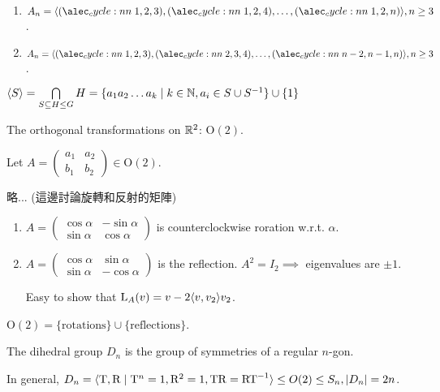 \begin{exercise} \mbox{}
  \begin{enumerate}
    \item $A_n = \langle\cycle{1,2,3},\cycle{1,2,4},\dots,\cycle{1,2,n}\rangle, n \ge 3$.
    \item $A_n = \langle\cycle{1,2,3},\cycle{2,3,4},\dots,\cycle{n-2,n-1,n}\rangle, n \ge 3$.
  \end{enumerate}
\end{exercise}

\begin{remark}
  $\langle S \rangle = \bigcap\limits_{S \subseteq H \le G} H =
  \{ a_1a_2\dots a_k \mid k \in \mathbb{N}, a_i \in S \cup S^{-1}\} \cup \{1\}$
\end{remark}

The orthogonal transformations on $\mathbb{R}^2$: $\text{O}(2)$.

Let $A = \begin{pmatrix}a_1 & a_2 \\ b_1 & b_2\end{pmatrix} \in \text{O}(2)$.

略... (這邊討論旋轉和反射的矩陣)

\begin{enumerate}
  \item $A = \begin{pmatrix}
      \cos\alpha & -\sin\alpha \\
      \sin\alpha & \cos\alpha
    \end{pmatrix}$ is counterclockwise roration w.r.t. $\alpha$.
  \item $A = \begin{pmatrix}
      \cos\alpha & \sin\alpha \\
      \sin\alpha & -\cos\alpha
    \end{pmatrix}$ is the reflection.
    $A^2 = I_2 \implies$ eigenvalues are $\pm 1$.

    Easy to show that $\text{L}_A(v) = v - 2 \langle v, v_2\rangle v_2$.
\end{enumerate}

$\text{O}(2) = \{\text{rotations}\} \cup \{\text{reflections}\}$.

\begin{definition}
  The dihedral group $D_n$ is the group of symmetries of a regular $n$-gon.

  In general, $D_n = \langle {\rm T, R} \mid
  {\rm T}^n = 1, {\rm R}^2 = 1, {\rm TR} = {\rm RT}^{-1} \rangle \le O(2)
  \le S_n, \lvert D_n\rvert = 2n$.
\end{definition}

